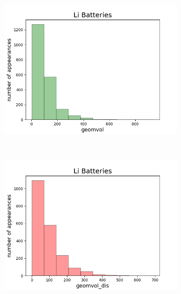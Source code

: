  \begin{figure}[h]
     \centering
     \begin{subfigure}{0.23\textwidth}
         \centering
         \includegraphics[width=\linewidth]{result/figures/distribution/Li_distrof_geomvol.png}
     \end{subfigure}
     ~ 
     \begin{subfigure}{0.23\textwidth}
         \centering
         \includegraphics[width=\linewidth]{result/figures/distribution/Li_distrof_geomvol_dis.png}
     \end{subfigure}
          ~ 
     \begin{subfigure}{0.23\textwidth}
         \centering

\end{subfigure}
\end{figure}
